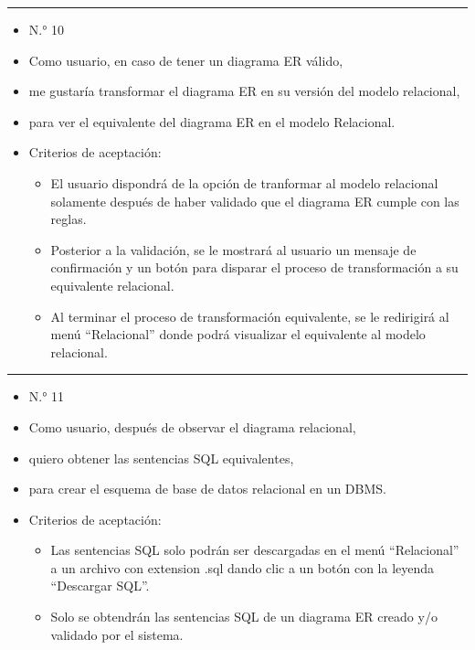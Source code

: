 \noindent\rule{\textwidth}{1pt}
\begin{itemize}
	\item N.° 10
	\item Como usuario, en caso de tener un diagrama ER válido,
	\item me gustaría transformar el diagrama ER en su versión del modelo relacional,
	\item para ver el equivalente del diagrama ER en el modelo Relacional.
	\item Criterios de aceptación:
	\begin{itemize}
		\item El usuario dispondrá de la opción de tranformar al modelo relacional solamente después de haber validado que el diagrama ER cumple con las reglas.
		\item Posterior a la validación, se le mostrará al usuario un mensaje de confirmación y un botón para disparar el proceso de transformación a su equivalente relacional.
		\item Al terminar el proceso de transformación equivalente, se le redirigirá al menú ``Relacional'' donde podrá visualizar el equivalente al modelo relacional.
	\end{itemize}
\end{itemize}
\noindent\rule{\textwidth}{1pt}
\begin{itemize}
	\item N.° 11
	\item Como usuario, después de observar el diagrama relacional,
	\item quiero obtener las sentencias SQL equivalentes,
	\item para crear el esquema de base de datos relacional en un DBMS.
	\item Criterios de aceptación:
	\begin{itemize}
		\item Las sentencias SQL solo podrán ser descargadas en el menú ``Relacional'' a un archivo con extension .sql dando clic a un botón con la leyenda ``Descargar SQL''.
		\item Solo se obtendrán las sentencias SQL de un diagrama ER creado y/o validado por el sistema.
	\end{itemize}
\end{itemize}
